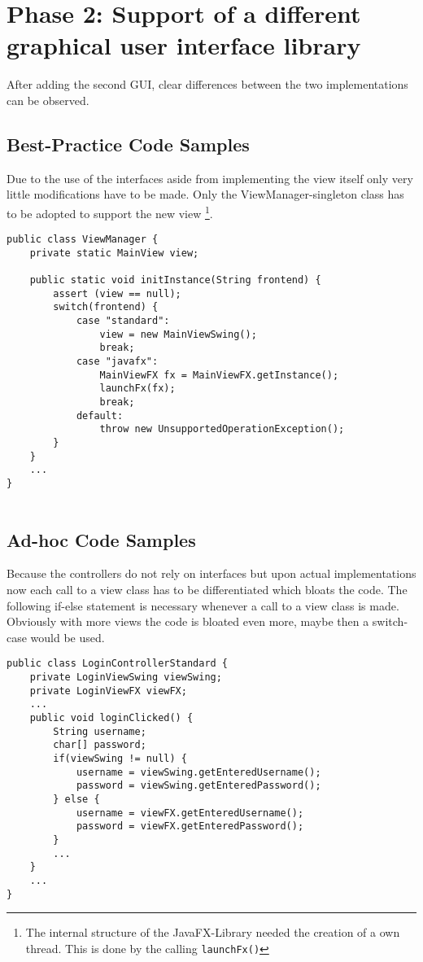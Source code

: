 \clearpage

\section{Phase 2: Support of a different graphical user interface library}
After adding the second GUI, clear differences between the two implementations can be observed.

\subsection{Best-Practice Code Samples}
Due to the use of the interfaces aside from implementing the view itself only very little modifications have to be made. Only the ViewManager-singleton class has to be adopted to support the new view \footnote{The internal structure of the JavaFX-Library needed the creation of a own thread. This is done by the calling \texttt{launchFx()}}.

\begin{lstlisting}[caption={View Manager after implementation of a second GUI. Only a case branch has to be added.}, captionpos=b]
public class ViewManager {
	private static MainView view;
	
	public static void initInstance(String frontend) {
		assert (view == null);
		switch(frontend) {
			case "standard":
				view = new MainViewSwing();
				break;
			case "javafx":
				MainViewFX fx = MainViewFX.getInstance();
				launchFx(fx);
				break;
			default:
				throw new UnsupportedOperationException();
		}
	}
	...
}
	
\end{lstlisting}

\subsection{Ad-hoc Code Samples}
\label{sec:ad-hoc-javafx}
Because the controllers do not rely on interfaces but upon actual implementations now each call to a view class has to be differentiated which bloats the code. The following if-else statement is necessary whenever a call to a view class is made. Obviously with more views the code is bloated even more, maybe then a switch-case would be used.

\begin{lstlisting}[caption={[Code snipped showing login-code after implementing a second GUI.]Code snipped showing login-code after implementing a second GUI. Because no interface but concrete implementations are used each time a view access is needed the program is required to check for which of the two GUIs is currently active. Controller methods of the best pratice version do not change in any way.}, captionpos=b, label={lst:controller-switch}]
public class LoginControllerStandard {
	private LoginViewSwing viewSwing;
	private LoginViewFX viewFX;
	...
	public void loginClicked() {
		String username;
		char[] password;
		if(viewSwing != null) {
			username = viewSwing.getEnteredUsername();
			password = viewSwing.getEnteredPassword();
		} else {
			username = viewFX.getEnteredUsername();
			password = viewFX.getEnteredPassword();
		}
		...
	}
	...
}
\end{lstlisting}


